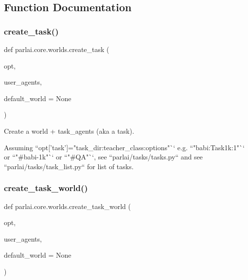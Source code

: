 \subsection{Function Documentation}
\mbox{\label{namespaceparlai_1_1core_1_1worlds_a11923c10b545c7ecc1b08fe2242d9c2c}} 
\subsubsection{\texorpdfstring{create\+\_\+task()}{create\_task()}}
{\footnotesize\ttfamily def parlai.\+core.\+worlds.\+create\+\_\+task (\begin{DoxyParamCaption}\item[{}]{opt,  }\item[{}]{user\+\_\+agents,  }\item[{}]{default\+\_\+world = {\ttfamily None} }\end{DoxyParamCaption})}

\begin{DoxyVerb}Create a world + task_agents (aka a task).

Assuming ``opt['task']="task_dir:teacher_class:options"`` e.g. ``"babi:Task1k:1"``
or ``"#babi-1k"`` or ``"#QA"``, see ``parlai/tasks/tasks.py`` and see
``parlai/tasks/task_list.py`` for list of tasks.
\end{DoxyVerb}
 \mbox{\label{namespaceparlai_1_1core_1_1worlds_a055ee493c9ed03ecff4832f52b408f8c}} 
\subsubsection{\texorpdfstring{create\+\_\+task\+\_\+world()}{create\_task\_world()}}
{\footnotesize\ttfamily def parlai.\+core.\+worlds.\+create\+\_\+task\+\_\+world (\begin{DoxyParamCaption}\item[{}]{opt,  }\item[{}]{user\+\_\+agents,  }\item[{}]{default\+\_\+world = {\ttfamily None} }\end{DoxyParamCaption})}

